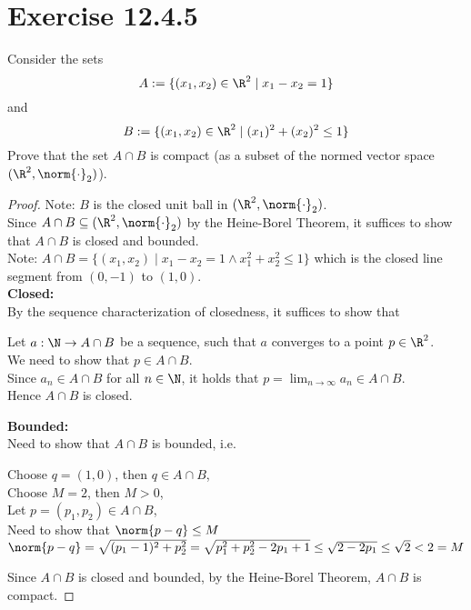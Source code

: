\documentclass{assignment}
\begin{document}
\section{Exercise 12.4.5}
\begin{problem}
    Consider the sets
    $$A := \{(x_1,x_2) \in \R^2 \mid x_1-x_2 = 1\}$$
    and 
    $$B := \{(x_1,x_2) \in \R^2 \mid (x_1)^2 + (x_2)^2 \le 1\}$$
    Prove that the set $A \cap B$ is compact (as a subset of the normed vector space $(\R^2, \norm{\cdot}_2)$).
\end{problem}
\begin{proof}
    Note: $B$ is the closed unit ball in $(\R^2, \norm{\cdot}_2)$. \\
    Since $A \cap B \subseteq (\R^2, \norm{\cdot}_2)$ by the Heine-Borel Theorem, it suffices to show that $A \cap B$ is closed and bounded.\\
    Note: $A \cap B = \{(x_1,x_2) \mid x_1-x_2=1 \land x_1^2+x_2^2\le1\}$ which is the closed line segment from $(0,-1)$ to $(1,0)$.\\

    \textbf{Closed:} \\
    By the sequence characterization of closedness, it suffices to show that 
    \begin{myCenter}
    \end{myCenter}
    Let $a: \N \to A \cap B$ be a sequence, such that $a$ converges to a point $p \in \R^2$. \\
    We need to show that $p \in A \cap B$. \\
    Since $a_n \in A \cap B$ for all $n \in \N$, it holds that $p = \lim_{n\to\infty}a_n \in A \cap B$. \\
    Hence $A \cap B$ is closed.

    \textbf{Bounded:} \\
    Need to show that $A \cap B$ is bounded, i.e. 
    \begin{myCenter}
    \end{myCenter}
    Choose $q = (1,0)$, then $q \in A \cap B$, \\
    Choose $M = 2$, then $M > 0$, \\
    Let $p = (p_1, p_2) \in A \cap B$, \\
    Need to show that $\norm{p-q} \le M$ \\
    $\norm{p-q} = \sqrt{(p_1-1)^2 + p_2^2} = \sqrt{p_1^2+p_2^2-2p_1+1} \le \sqrt{2 - 2p_1} \le \sqrt{2} < 2 = M$

    Since $A \cap B$ is closed and bounded, by the Heine-Borel Theorem, $A \cap B$ is compact.
\end{proof}
\end{document}
